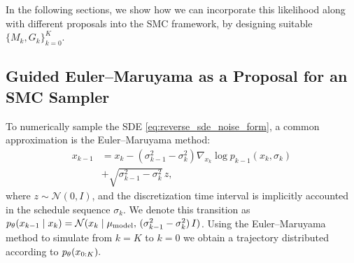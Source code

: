 In the following sections, we show how we can incorporate this likelihood along with different proposals into the SMC framework, by designing suitable $\lbrace M_k, G_k \rbrace_{k=0}^K$. 

\subsection{Guided Euler--Maruyama as a Proposal for an SMC Sampler}
To numerically sample the SDE \eqref{eq:reverse_sde_noise_form}, a common approximation is the Euler--Maruyama method:  
\begin{align}
    x_{k-1} &= x_{k} -(\sigma_{k-1}^2 - \sigma_{k}^2)\nabla_{x_{k}}\log p_{k-1}(x_{k}, \sigma_{k}) \nonumber \\
    &+ \sqrt{\sigma_{k-1}^2 - \sigma_{k}^2} \, z,
    \label{eq:EM_score}
\end{align}
where $z \sim \mathcal{N}(0, I)$, and the discretization time interval is implicitly accounted in the schedule sequence $\sigma_k$. We denote this transition as $p_\theta(x_{k-1} \mid x_{k}) = \mathcal{N}(x_k \mid \mu_{\text{model}}, \, (\sigma_{k-1}^2 - \sigma_{k}^2) \, I)$. Using the Euler--Maruyama method to simulate from $k=K$ to $k=0$ we obtain a trajectory distributed according to 
$p_\theta(x_{0:K}).$

